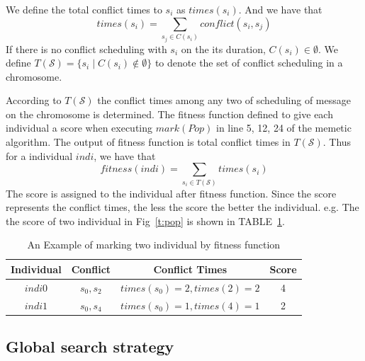 \documentclass[journal]{IEEEtran}
\newcommand{\calS}{\mathcal{S}}
\theoremstyle{remark}
\begin{document}
We define the total conflict times to $s_{i}$ as $times(s_i)$. And we have that
\begin{equation}
	times(s_i)=\sum_{ s_j \in C(s_i) } conflict(s_i,s_j)
\end{equation}
If there is no conflict scheduling with $s_i$ on the its duration,
 $C(s_i)\in \emptyset$.
We define $T(\calS) = \{ s_i \mid C(s_i) \notin \emptyset \} $ to denote the set of conflict scheduling in a chromosome.

According to $T(\calS)$ the conflict times among any two of scheduling of message on the chromosome is determined.
The fitness function defined to give each individual a score when executing $mark(Pop)$ in line 5, 12, 24 of the memetic algorithm.
The output of fitness function is total conflict times in $T(\calS)$.
Thus for a individual $indi$, we have that
\begin{equation}
	fitness(indi)=\sum_{s_i \in T(\calS)} {times(s_i)}
\end{equation}
The score is assigned to the individual after fitness function.
Since the score represents the conflict times, the less the score the better the individual.
e.g. The the score of two individual in Fig~\ref{t:pop} is shown in TABLE~\ref{t:fitness}. 

\begin{table}[!t]
	\renewcommand{\arraystretch}{1.3}
	\caption{An Example of marking two individual by fitness function}
	\label{t:fitness}
	\centering
	\begin{tabular}{|c||c||c||c|}
		\hline
		\textbf{Individual} & \textbf{Conflict} &\textbf{Conflict Times} &\textbf{Score}\\
		\hline 
		$indi0$ &$s_0,s_2$ & $times(s_0)=2,times(2)=2$ &4\\
		\hline
		$indi1$ & $s_0,s_4$& $times(s_0)=1,times(4)=1$ &2\\
		\hline
		\end{tabular}	
\end{table}

\subsection{Global search strategy \label{s:glo}}
\end{document}
